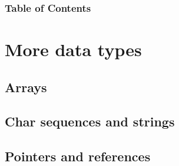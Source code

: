 \documentclass{beamer}
\subtitle{Session 3: More data types}
\begin{document}
\frame{\titlepage}

\begin{frame}
\frametitle{Table of Contents}
\tableofcontents
\end{frame}


\section{More data types}

\subsection{Arrays}



\subsection{Char sequences and strings}



\subsection{Pointers and references}

\end{document}
